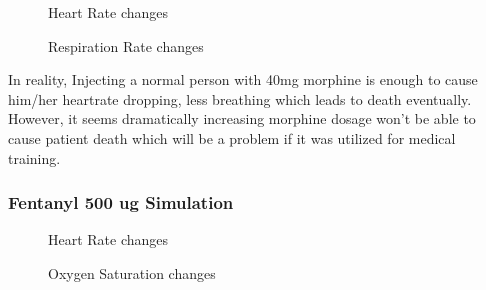 \documentclass[a4paper]{article}
\begin{document}
\begin{figure}[!htb]\centering
   \begin{minipage}{0.49\textwidth}
     \caption{Heart Rate changes}
     \label{fig:given 40 mg Morphine}
   \end{minipage}
   \begin {minipage}{0.49\textwidth}
     \caption{Respiration Rate changes}
     \label{fig:given 40 mg Morphine}
   \end{minipage}
\end{figure}

In reality, Injecting a normal person with 40mg morphine is enough to cause him/her heartrate dropping, less breathing which leads to death eventually. However, it seems dramatically increasing morphine dosage won't  
be able to cause patient death which will be a problem if it was utilized for medical training.

\subsubsection{Fentanyl 500 ug Simulation}

\begin{figure}[!htb]\centering
   \begin{minipage}{0.49\textwidth}
     \caption{Heart Rate changes}
     \label{fig:given 500 ug Fentanyl}
     
   \end{minipage}
   \begin {minipage}{0.49\textwidth}
     \caption{Oxygen Saturation changes}
     \label{fig:given 500 ug Fentanyl}
   \end{minipage}
\end{figure}
\end{document}
